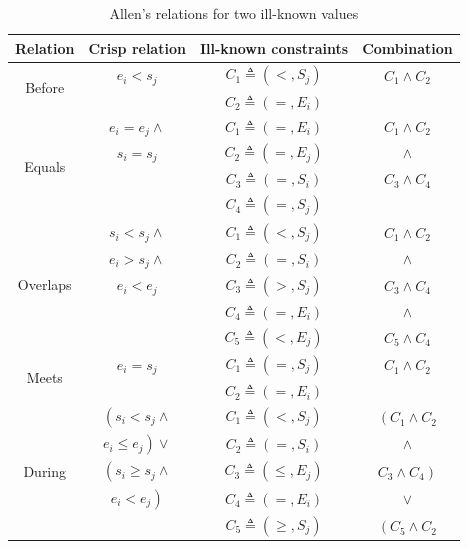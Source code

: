 \documentclass{llncs}
\begin{document}
\begin{table}
\centering
\caption{Allen's relations for two ill-known values}

\begin{tabular}{c c c c}
\hline
Relation & Crisp relation & Ill-known constraints & Combination \\ \hline
\multirow{2}{*}{Before}
&  $e_i < s_j$ & $C_1 \triangleq \left(<, S_j \right)$ & $C_1 \wedge C_2$\\
& & $C_2 \triangleq \left(= , E_i \right)$ &\\ \hline
\multirow{4}{*}{Equals}
&  $e_i = e_j \wedge $ & $C_1 \triangleq \left(=, E_i \right)$ & $C_1 \wedge C_2$\\
& $s_i = s_j $& $C_2 \triangleq \left(= , E_j \right)$ & $\wedge$\\
& & $C_3 \triangleq \left(= , S_i \right)$ & $C_3 \wedge C_4$\\
& & $C_4 \triangleq \left(= , S_j \right)$ &\\ \hline
\multirow{5}{*}{Overlaps}
&  $s_i < s_j \wedge $ & $C_1 \triangleq \left(< , S_j \right)$ & $C_1 \wedge C_2$\\
& $e_i > s_j \wedge $  & $C_2 \triangleq \left(= , S_i \right)$ & $\wedge$\\
& $e_i < e_j $         & $C_3 \triangleq \left(> , S_j \right)$ & $C_3 \wedge C_4$\\
&                      & $C_4 \triangleq \left(= , E_i \right)$ & $\wedge $ \\
&                      & $C_5 \triangleq \left(< , E_j \right)$ & $ C_5 \wedge C_4 $\\ \hline
\multirow{2}{*}{Meets}
& $e_i = s_j$ & $C_1 \triangleq \left(= , S_j \right)$ & $C_1 \wedge C_2$\\
&	      & $C_2 \triangleq \left(= , E_i \right)$ & \\ \hline
\multirow{5}{*}{During}
&  $ \left( s_i < s_j \wedge \right. $ & $C_1 \triangleq \left(< , S_j \right)$     & $ \left( C_1 \wedge C_2 \right.$\\
& $\left. e_i \leq e_j\right) \vee $   & $C_2 \triangleq \left(= , S_i \right)$     & $\wedge$\\
& $\left(s_i \geq s_j  \wedge \right.$ & $C_3 \triangleq \left(\leq , E_j \right)$  & $ \left.C_3 \wedge C_4 \right)$\\
& $\left. e_i < e_j \right)$           & $C_4 \triangleq \left(= , E_i \right)$     & $\vee $ \\
&                                      & $C_5 \triangleq \left(\geq , S_j \right)$  & $\left( C_5 \wedge C_2 \right.$\\ 

\end{tabular}
\end{table}
\end{document}

